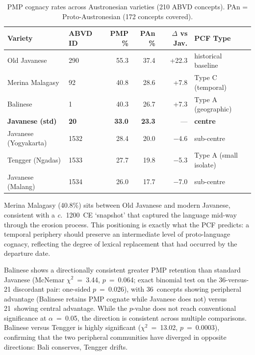 \documentclass[12pt,a4paper]{article}
\begin{document}
\begin{table}[htbp]
\centering
\caption{PMP cognacy rates across Austronesian varieties (210 ABVD concepts). PAn = Proto-Austronesian (172 concepts covered).}
\label{tab:cognacy}
\begin{tabular}{llrrrl}
\toprule
Variety & ABVD ID & PMP \% & PAn \% & $\Delta$ vs Jav. & PCF Type \\
\midrule
Old Javanese           & 290  & 55.3 & 37.4 & +22.3 & historical baseline \\
Merina Malagasy        & 92   & 40.8 & 28.6 & +7.8  & Type C (temporal) \\
Balinese               & 1    & 40.3 & 26.7 & +7.3  & Type A (geographic) \\
\textbf{Javanese (std)} & \textbf{20} & \textbf{33.0} & \textbf{23.3} & --- & \textbf{centre} \\
Javanese (Yogyakarta)  & 1532 & 28.4 & 20.0 & $-$4.6  & sub-centre \\
Tengger (Ngadas)       & 1533 & 27.7 & 19.8 & $-$5.3  & Type A (small isolate) \\
Javanese (Malang)      & 1534 & 26.0 & 17.7 & $-$7.0  & sub-centre \\
\bottomrule
\end{tabular}
\end{table}

Merina Malagasy (40.8\%) sits between Old Javanese and modern Javanese, consistent with a \textit{c.}~1200~CE `snapshot' that captured the language mid-way through the erosion process. This positioning is exactly what the PCF predicts: a temporal periphery should preserve an intermediate level of proto-language cognacy, reflecting the degree of lexical replacement that had occurred by the departure date.

Balinese shows a directionally consistent greater PMP retention than standard Javanese (McNemar $\chi^2$~=~3.44, $p$~=~0.064; exact binomial test on the 36-versus-21 discordant pair: one-sided $p$~=~0.026), with 36~concepts showing peripheral advantage (Balinese retains PMP cognate while Javanese does not) versus 21~showing central advantage. While the $p$-value does not reach conventional significance at $\alpha$~=~0.05, the direction is consistent across multiple comparisons. Balinese versus Tengger is highly significant ($\chi^2$~=~13.02, $p$~=~0.0003), confirming that the two peripheral communities have diverged in opposite directions: Bali conserves, Tengger drifts.
\end{document}
